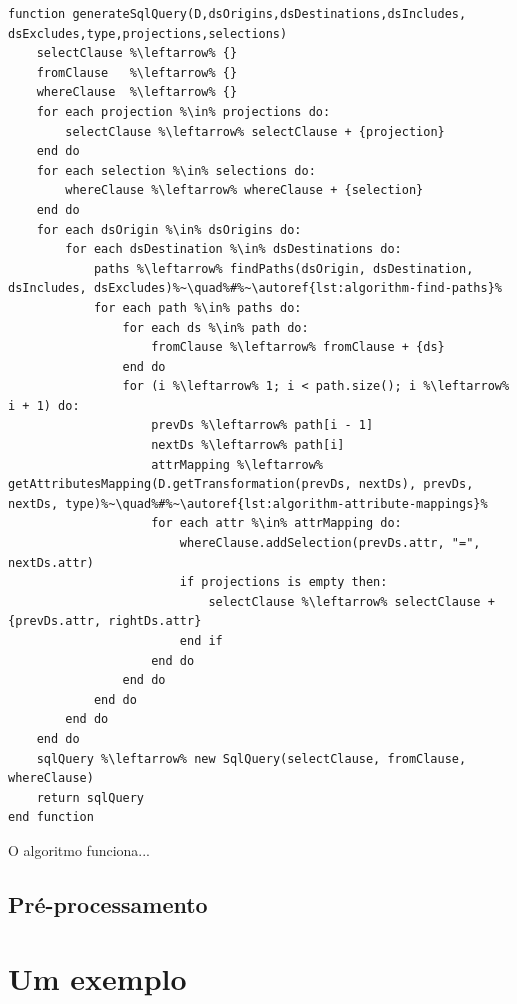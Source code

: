 \begin{minipage}[c]{0.95\textwidth}
\begin{lstlisting}[language=pseudocode,label={lst:algorithm-generate-sql-query},caption={[Geração da consulta em SQL]Geração da consulta na linguagem SQL a partir das especificações do usuário.}]
function generateSqlQuery(D,dsOrigins,dsDestinations,dsIncludes, dsExcludes,type,projections,selections)
    selectClause %\leftarrow% {}
    fromClause   %\leftarrow% {}
    whereClause  %\leftarrow% {}
    for each projection %\in% projections do:
        selectClause %\leftarrow% selectClause + {projection}
    end do
    for each selection %\in% selections do:
        whereClause %\leftarrow% whereClause + {selection}
    end do
    for each dsOrigin %\in% dsOrigins do:
        for each dsDestination %\in% dsDestinations do:
            paths %\leftarrow% findPaths(dsOrigin, dsDestination, dsIncludes, dsExcludes)%~\quad%#%~\autoref{lst:algorithm-find-paths}%
            for each path %\in% paths do:
                for each ds %\in% path do:
                    fromClause %\leftarrow% fromClause + {ds}
                end do                
                for (i %\leftarrow% 1; i < path.size(); i %\leftarrow% i + 1) do:
                    prevDs %\leftarrow% path[i - 1]
                    nextDs %\leftarrow% path[i]
                    attrMapping %\leftarrow% getAttributesMapping(D.getTransformation(prevDs, nextDs), prevDs, nextDs, type)%~\quad%#%~\autoref{lst:algorithm-attribute-mappings}%
                    for each attr %\in% attrMapping do:
                        whereClause.addSelection(prevDs.attr, "=", nextDs.attr)
                        if projections is empty then:
                            selectClause %\leftarrow% selectClause + {prevDs.attr, rightDs.attr}
                        end if
                    end do
                end do
            end do
        end do
    end do
    sqlQuery %\leftarrow% new SqlQuery(selectClause, fromClause, whereClause)
    return sqlQuery
end function
\end{lstlisting}
\end{minipage}

O algoritmo funciona...


\subsection{Pré-processamento}%
\label{subsec:preprocessamento}


\section{Um exemplo}

